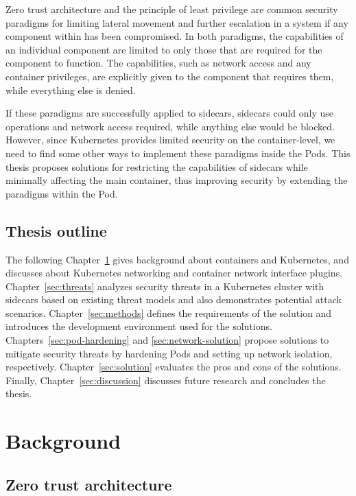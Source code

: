 \documentclass[english, 12pt, a4paper, sci, utf8, a-2b, online]{aaltothesis}
\begin{document}
Zero trust architecture and the principle of least privilege are common security paradigms for limiting lateral movement and further escalation in a system if any component within has been compromised.
In both paradigms, the capabilities of an individual component are limited to only those that are required for the component to function.
The capabilities, such as network access and any container privileges, are explicitly given to the component that requires them, while everything else is denied.

If these paradigms are successfully applied to sidecars, sidecars could only use operations and network access required, while anything else would be blocked.
However, since Kubernetes provides limited security on the container-level, we need to find some other ways to implement these paradigms inside the Pods.
This thesis proposes solutions for restricting the capabilities of sidecars while minimally affecting the main container, thus improving security by extending the paradigms within the Pod.

\subsection{Thesis outline}

The following Chapter~\ref{sec:bg} gives background about containers and Kubernetes, and discusses about Kubernetes networking and container network interface plugins.
Chapter~\ref{sec:threats} analyzes security threats in a Kubernetes cluster with sidecars based on existing threat models and also demonstrates potential attack scenarios.
Chapter~\ref{sec:methods} defines the requirements of the solution and introduces the development environment used for the solutions.
Chapters~\ref{sec:pod-hardening} and \ref{sec:network-solution} propose solutions to mitigate security threats by hardening Pods and setting up network isolation, respectively.
Chapter~\ref{sec:solution} evaluates the pros and cons of the solutions.
Finally, Chapter~\ref{sec:discussion} discusses future research and concludes the thesis.

\clearpage

\section{Background} \label{sec:bg}

\subsection{Zero trust architecture}
\end{document}
